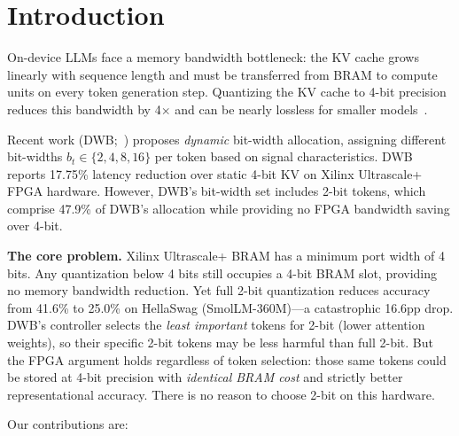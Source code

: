 \documentclass{article}
\begin{document}
\begin{abstract}
2.52--2.93$\times$ speedup, all exceeding DWB. Our FPGA cost model, binary controller, and per-token quality method are released as a reference implementation at \url{https://github.com/LonghornSilicon/dont-waste-bits}.
\end{abstract}

\section{Introduction}

On-device LLMs face a memory bandwidth bottleneck: the KV cache grows linearly with sequence length and must be transferred from BRAM to compute units on every token generation step. Quantizing the KV cache to 4-bit precision reduces this bandwidth by 4$\times$ and can be nearly lossless for smaller models~\citep{liu2024kivi,hooper2024kvquant}.

Recent work (DWB;~\citep{haeri2026dwb}) proposes \emph{dynamic} bit-width allocation, assigning different bit-widths $b_t \in \{2, 4, 8, 16\}$ per token based on signal characteristics. DWB reports 17.75\% latency reduction over static 4-bit KV on Xilinx Ultrascale+ FPGA hardware. However, DWB's bit-width set includes 2-bit tokens, which comprise 47.9\% of DWB's allocation while providing no FPGA bandwidth saving over 4-bit.

\textbf{The core problem.} Xilinx Ultrascale+ BRAM has a minimum port width of 4 bits. Any quantization below 4 bits still occupies a 4-bit BRAM slot, providing no memory bandwidth reduction. Yet full 2-bit quantization reduces accuracy from 41.6\% to 25.0\% on HellaSwag (SmolLM-360M)---a catastrophic 16.6pp drop. DWB's controller selects the \emph{least important} tokens for 2-bit (lower attention weights), so their specific 2-bit tokens may be less harmful than full 2-bit. But the FPGA argument holds regardless of token selection: those same tokens could be stored at 4-bit precision with \emph{identical BRAM cost} and strictly better representational accuracy. There is no reason to choose 2-bit on this hardware.

Our contributions are:
\end{document}

